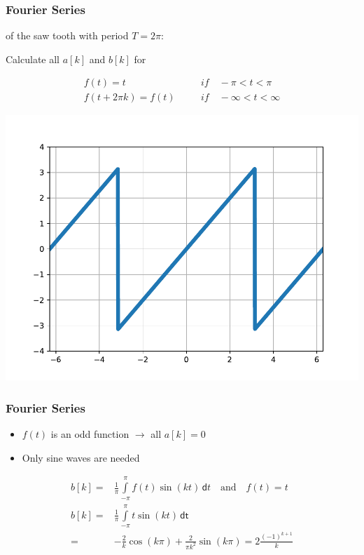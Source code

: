 \begin{frame}
    \frametitle{Fourier Series}

    \myExample of the saw tooth with period $T=2\pi$:\newline

    Calculate all $a[k]$ and $b[k]$ for

    \begin{eqnarray*}
        f(t) = t &\quad& if \quad -\pi < t < \pi\\
        f(t + 2\pi k) = f(t) &\quad& if \quad -\infty < t < \infty
    \end{eqnarray*}

    \begin{center}
        \includegraphics[height=0.5\textheight, trim={0  0.5cm 0 1cm},clip]{zigzag_signal.pdf}
    \end{center}

\end{frame}



\begin{frame}
    \frametitle{Fourier Series}

    \begin{itemize}
        \item $f(t)$ is an odd function $\rightarrow$ all $a[k]=0$
        \item Only sine waves are needed
    \end{itemize}

    \begin{align*}
        b[k] = & \frac{1}{\pi} \int\limits_{-\pi}^{\pi} f(t) \sin ( kt) \, \mathsf{d}t \quad \text{and} \quad f(t)=t \\
        b[k] = & \frac{1}{\pi} \int\limits_{-\pi}^{\pi} t \sin (kt) \, \mathsf{dt}                                   \\
        =      & -\frac{2}{k} \cos (k\pi) + \frac{2}{\pi k^2} \sin (k\pi) = 2 \frac{(-1)^{k+1}}{k}
    \end{align*}

\end{frame}



